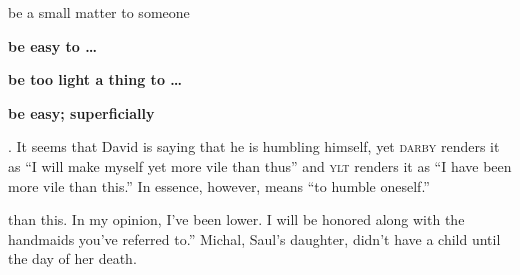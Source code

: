 \begin{inparaenum}
{\begin{inparaenum}
        \item be a small matter to someone
        \item \textbf{be easy to \dots}
        \item \textbf{be too light a thing to \dots}
        \item \textbf{be easy; superficially}
    \end{inparaenum}%
    . It seems that David is saying that he is humbling himself, yet \textsc{darby} renders it as ``I will make myself yet more vile than thus'' and \textsc{ylt} renders it as ``I have been more vile than this.'' In essence, however,  means ``to humble oneself.''} than this. In my opinion, I've been lower. I will be honored along with the handmaids you've referred to.''%
     Michal, Saul's daughter, didn't have a child until the day of her death.%
\end{inparaenum}
